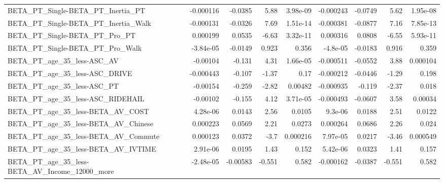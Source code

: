 \begin{tabular}{lrrrrrrrr}
BETA\_PT\_Single-BETA\_PT\_Inertia\_PT                  &   -0.000116 &      -0.0385 &     5.88 & 3.98e-09 &  -0.000243 &     -0.0749 &         5.62 &      1.95e-08 \\
BETA\_PT\_Single-BETA\_PT\_Inertia\_Walk                &   -0.000131 &      -0.0326 &     7.69 & 1.51e-14 &  -0.000381 &     -0.0877 &         7.16 &      7.85e-13 \\
BETA\_PT\_Single-BETA\_PT\_Pro\_PT                      &    0.000199 &       0.0535 &    -6.63 & 3.32e-11 &   0.000316 &      0.0808 &        -6.55 &      5.93e-11 \\
BETA\_PT\_Single-BETA\_PT\_Pro\_Walk                    &   -3.84e-05 &      -0.0149 &    0.923 &    0.356 &   -4.8e-05 &     -0.0183 &        0.916 &         0.359 \\
BETA\_PT\_age\_35\_less-ASC\_AV                         &    -0.00104 &       -0.131 &     4.31 & 1.66e-05 &  -0.000511 &     -0.0552 &         3.88 &      0.000104 \\
BETA\_PT\_age\_35\_less-ASC\_DRIVE                      &   -0.000443 &       -0.107 &    -1.37 &     0.17 &  -0.000212 &     -0.0446 &        -1.29 &         0.198 \\
BETA\_PT\_age\_35\_less-ASC\_PT                         &    -0.00154 &       -0.259 &    -2.82 &  0.00482 &  -0.000935 &      -0.119 &        -2.37 &         0.018 \\
BETA\_PT\_age\_35\_less-ASC\_RIDEHAIL                   &    -0.00102 &       -0.155 &     4.12 & 3.71e-05 &  -0.000493 &     -0.0607 &         3.58 &       0.00034 \\
BETA\_PT\_age\_35\_less-BETA\_AV\_COST                   &    4.28e-06 &       0.0143 &     2.56 &   0.0105 &    9.3e-06 &      0.0188 &         2.51 &        0.0122 \\
BETA\_PT\_age\_35\_less-BETA\_AV\_Chinese                &    0.000223 &       0.0569 &     2.21 &   0.0273 &   0.000264 &      0.0686 &         2.26 &         0.024 \\
BETA\_PT\_age\_35\_less-BETA\_AV\_Commute                &    0.000123 &       0.0372 &     -3.7 & 0.000216 &   7.97e-05 &      0.0217 &        -3.46 &      0.000549 \\
BETA\_PT\_age\_35\_less-BETA\_AV\_IVTIME                 &    2.91e-06 &       0.0195 &     1.43 &    0.152 &   5.42e-06 &      0.0323 &         1.41 &         0.157 \\
BETA\_PT\_age\_35\_less-BETA\_AV\_Income\_12000\_more      &   -2.48e-05 &     -0.00583 &   -0.551 &    0.582 &  -0.000162 &     -0.0387 &       -0.551 &         0.582 \\

\end{tabular}

